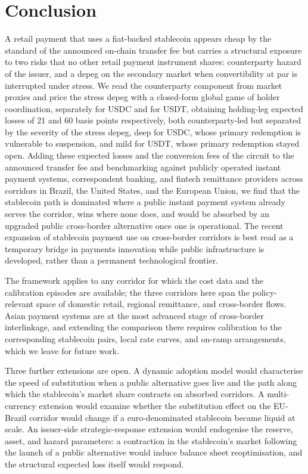 \section{Conclusion}\label{sec:conclusion}

A retail payment that uses a fiat-backed stablecoin appears cheap by the standard of the announced on-chain transfer fee but carries a structural exposure to two risks that no other retail payment instrument shares: counterparty hazard of the issuer, and a depeg on the secondary market when convertibility at par is interrupted under stress. We read the counterparty component from market proxies and price the stress depeg with a closed-form global game of holder coordination, separately for USDC and for USDT, obtaining holding-leg expected losses of 21 and 60 basis points respectively, both counterparty-led but separated by the severity of the stress depeg, deep for USDC, whose primary redemption is vulnerable to suspension, and mild for USDT, whose primary redemption stayed open. Adding these expected losses and the conversion fees of the circuit to the announced transfer fee and benchmarking against publicly operated instant payment systems, correspondent banking, and fintech remittance providers across corridors in Brazil, the United States, and the European Union, we find that the stablecoin path is dominated where a public instant payment system already serves the corridor, wins where none does, and would be absorbed by an upgraded public cross-border alternative once one is operational. The recent expansion of stablecoin payment use on cross-border corridors is best read as a temporary bridge in payments innovation while public infrastructure is developed, rather than a permanent technological frontier.

The framework applies to any corridor for which the cost data and the calibration episodes are available; the three corridors here span the policy-relevant space of domestic retail, regional remittance, and cross-border flows. Asian payment systems are at the most advanced stage of cross-border interlinkage, and extending the comparison there requires calibration to the corresponding stablecoin pairs, local rate curves, and on-ramp arrangements, which we leave for future work.

Three further extensions are open. A dynamic adoption model would characterise the speed of substitution when a public alternative goes live and the path along which the stablecoin's market share contracts on absorbed corridors. A multi-currency extension would examine whether the substitution effect on the EU-Brazil corridor would change if a euro-denominated stablecoin became liquid at scale. An issuer-side strategic-response extension would endogenise the reserve, asset, and hazard parameters: a contraction in the stablecoin's market following the launch of a public alternative would induce balance sheet reoptimisation, and the structural expected loss itself would respond.
